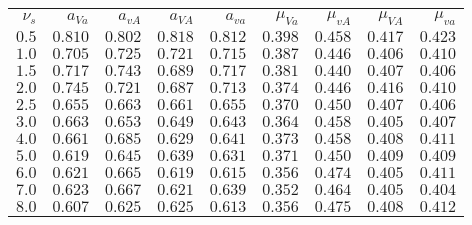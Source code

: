 {\small%
\begin{tabular}{r|rrrrrrrr}
$\nu_s$ & $a_{\mathit{Va}}$ & $a_{\mathit{vA}}$ & $a_{\mathit{VA}}$ & $a_{\mathit{va}}$ & $\mu_{\mathit{Va}}$ & $\mu_{\mathit{vA}}$ & $\mu_{\mathit{VA}}$ & $\mu_{\mathit{va}}$\\
$0.5$ & $0.810$ & $0.802$ & $0.818$ & $0.812$ & $0.398$ & $0.458$ & $0.417$ & $0.423$\\
$1.0$ & $0.705$ & $0.725$ & $0.721$ & $0.715$ & $0.387$ & $0.446$ & $0.406$ & $0.410$\\
$1.5$ & $0.717$ & $0.743$ & $0.689$ & $0.717$ & $0.381$ & $0.440$ & $0.407$ & $0.406$\\
$2.0$ & $0.745$ & $0.721$ & $0.687$ & $0.713$ & $0.374$ & $0.446$ & $0.416$ & $0.410$\\
$2.5$ & $0.655$ & $0.663$ & $0.661$ & $0.655$ & $0.370$ & $0.450$ & $0.407$ & $0.406$\\
$\mathbf{3.0}$ & $\mathbf{0.663}$ & $\mathbf{0.653}$ & $\mathbf{0.649}$ & $\mathbf{0.643}$ & $\mathbf{0.364}$ & $\mathbf{0.458}$ & $\mathbf{0.405}$ & $\mathbf{0.407}$\\
$4.0$ & $0.661$ & $0.685$ & $0.629$ & $0.641$ & $0.373$ & $0.458$ & $0.408$ & $0.411$\\
$5.0$ & $0.619$ & $0.645$ & $0.639$ & $0.631$ & $0.371$ & $0.450$ & $0.409$ & $0.409$\\
$6.0$ & $0.621$ & $0.665$ & $0.619$ & $0.615$ & $0.356$ & $0.474$ & $0.405$ & $0.411$\\
$7.0$ & $0.623$ & $0.667$ & $0.621$ & $0.639$ & $0.352$ & $0.464$ & $0.405$ & $0.404$\\
$8.0$ & $0.607$ & $0.625$ & $0.625$ & $0.613$ & $0.356$ & $0.475$ & $0.408$ & $0.412$\\
\end{tabular}
}